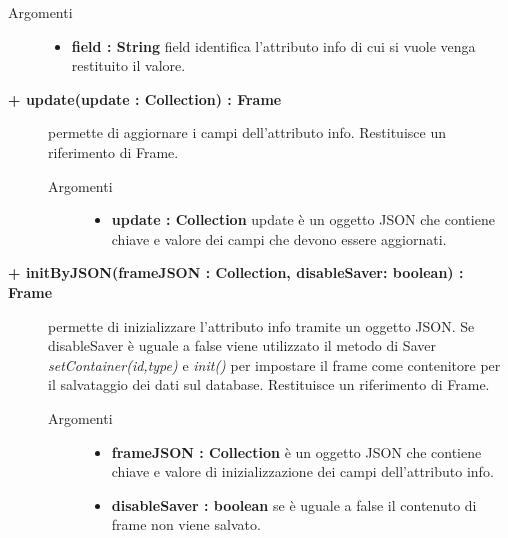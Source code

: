 \begin{description}
\begin{description}
		\begin{description}
			\item[Argomenti] \hfill
				\begin{itemize}
				
					\item \textbf{field : String			} \hfill
					field identifica l'attributo info di cui si vuole venga restituito il valore.
				\end{itemize}
		\end{description}

\end{description}

\begin{description}
		\item[\textbf{\color{blue}+ update(update : Collection) : Frame			}] \hfill
			permette di aggiornare i campi dell'attributo info. Restituisce un riferimento di Frame.
			
		\begin{description}
			\item[Argomenti] \hfill
				\begin{itemize}
				
					\item \textbf{update : Collection			} \hfill
					update è un oggetto JSON che contiene chiave e valore dei campi che devono essere aggiornati. 
				\end{itemize}
		\end{description}

\end{description}

\begin{description}
		\item[\textbf{\color{blue}+ initByJSON(frameJSON : Collection, disableSaver: boolean) : Frame			}] \hfill
			permette di inizializzare l'attributo info tramite un oggetto JSON. Se disableSaver è uguale a false viene utilizzato il metodo di Saver \textit{setContainer(id,type)} e \textit{init()} per impostare il frame come contenitore per il salvataggio dei dati sul database. Restituisce un riferimento di Frame.
			
		\begin{description}
			\item[Argomenti] \hfill
				\begin{itemize}
				
					\item \textbf{frameJSON : Collection			} \hfill
					è un oggetto JSON che contiene chiave e valore di inizializzazione dei campi dell'attributo info. 
					\item \textbf{disableSaver : boolean			} \hfill
					se è uguale a false il contenuto di frame non viene salvato.  				
				\end{itemize}
		\end{description}


\end{description}
\end{description}
